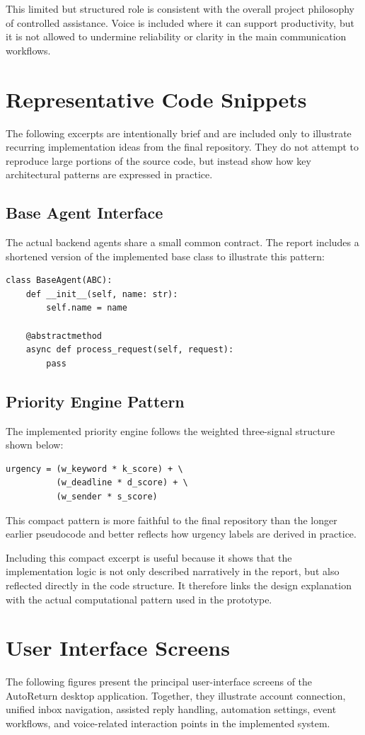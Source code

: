 This limited but structured role is consistent with the overall project philosophy of controlled assistance. Voice is included where it can support productivity, but it is not allowed to undermine reliability or clarity in the main communication workflows.

\section{Representative Code Snippets}
The following excerpts are intentionally brief and are included only to illustrate recurring implementation ideas from the final repository. They do not attempt to reproduce large portions of the source code, but instead show how key architectural patterns are expressed in practice.

\subsection{Base Agent Interface}
The actual backend agents share a small common contract. The report includes a shortened version of the implemented base class to illustrate this pattern:
\begin{verbatim}
class BaseAgent(ABC):
    def __init__(self, name: str):
        self.name = name

    @abstractmethod
    async def process_request(self, request):
        pass
\end{verbatim}

\subsection{Priority Engine Pattern}
The implemented priority engine follows the weighted three-signal structure shown below:
\begin{verbatim}
urgency = (w_keyword * k_score) + \
          (w_deadline * d_score) + \
          (w_sender * s_score)
\end{verbatim}
This compact pattern is more faithful to the final repository than the longer earlier pseudocode and better reflects how urgency labels are derived in practice.

Including this compact excerpt is useful because it shows that the implementation logic is not only described narratively in the report, but also reflected directly in the code structure. It therefore links the design explanation with the actual computational pattern used in the prototype.

\section{User Interface Screens}
The following figures present the principal user-interface screens of the AutoReturn desktop application. Together, they illustrate account connection, unified inbox navigation, assisted reply handling, automation settings, event workflows, and voice-related interaction points in the implemented system.

